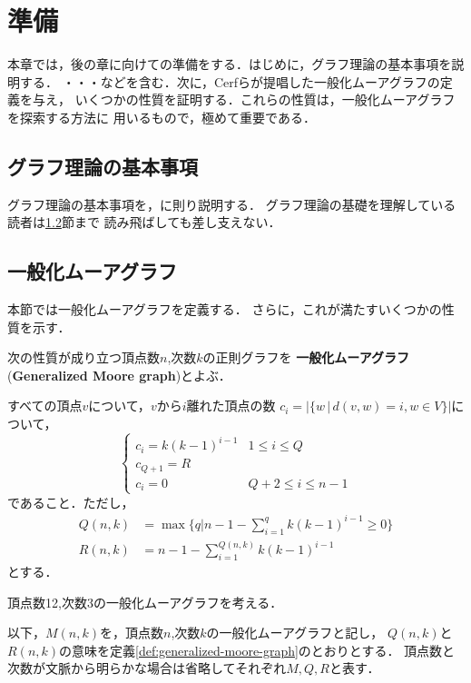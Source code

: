 
\chapter{準備}
\label{chap:preliminary}
本章では，後の章に向けての準備をする．はじめに，グラフ理論の基本事項を説明する．
・・・などを含む．次に，Cerfらが提唱した一般化ムーアグラフの定義を与え，
いくつかの性質を証明する．これらの性質は，一般化ムーアグラフを探索する方法に
用いるもので，極めて重要である．

\section{グラフ理論の基本事項}
\label{sect:basic-graph-theory}
グラフ理論の基本事項を，\cite{Diestel2000}に則り説明する．
グラフ理論の基礎を理解している読者は\ref{sect:generalized-moore-graph}節まで
読み飛ばしても差し支えない．

\section{一般化ムーアグラフ}
\label{sect:generalized-moore-graph}
本節では一般化ムーアグラフを定義する．
さらに，これが満たすいくつかの性質を示す．

\begin{definition}
  \label{def:generalized-moore-graph}
  次の性質が成り立つ頂点数$n$,次数$k$の正則グラフを
  \textbf{一般化ムーアグラフ}(\textbf{Generalized Moore graph})とよぶ．

  すべての頂点$v$について，$v$から$i$離れた頂点の数
  $c_i = \lvert\{ w\,|\,d(v,w) = i , w\in V \}\rvert$について，
  \[ \begin{cases}
    c_i = k(k-1)^{i-1} & 1\leq i\leq Q \\
    c_{Q+1} = R & \\
    c_i = 0 & Q+2\leq i \leq n-1
  \end{cases} \]
  であること．ただし，
  \begin{align*}
    Q(n,k) &= \max\{q | n-1-\sum_{i=1}^{q}k(k-1)^{i-1} \geq 0\} \\
    R(n,k) &= n - 1 - \sum_{i=1}^{Q(n,k)}k(k-1)^{i-1}
  \end{align*}
  とする．
\end{definition}
\begin{example}
  頂点数12,次数3の一般化ムーアグラフを考える．
\end{example}
以下，$M(n,k)$を，頂点数$n$,次数$k$の一般化ムーアグラフと記し，
$Q(n,k)$と$R(n,k)$の意味を定義\ref{def:generalized-moore-graph}のとおりとする．
頂点数と次数が文脈から明らかな場合は省略してそれぞれ$M,Q,R$と表す．

